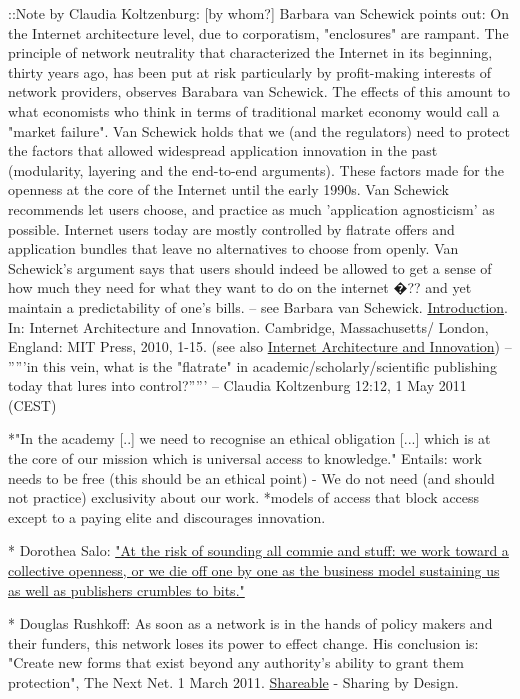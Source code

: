 \documentclass[final,authoryear,3p]{elsarticle-open-drafting}
\begin{document}
::Note by Claudia Koltzenburg:  [by whom?] Barbara van Schewick points out: On the Internet architecture level, due to corporatism, "enclosures" are rampant. The principle of network neutrality that characterized the Internet in its beginning, thirty years ago, has been put at risk particularly by profit-making interests of network providers, observes Barabara van Schewick. The effects of this amount to what economists who think in terms of traditional market economy would call a "market failure". Van Schewick holds that we (and the regulators) need to protect the factors that allowed widespread application innovation in the past (modularity, layering and the end-to-end arguments). These factors made for the openness at the core of the Internet until the early 1990s. Van Schewick recommends let users choose, and practice as much 'application agnosticism' as possible. Internet users today are mostly controlled by flatrate offers and application bundles that leave no alternatives to choose from openly. Van Schewick's argument says that users should indeed be allowed to get a sense of how much they need for what they want to do on the internet �?? and yet maintain a predictability of one's bills. -- see Barbara van Schewick. \href{http://mitpress.mit.edu/books/chapters/0262013975intro1.pdf}{Introduction}. In: Internet Architecture and Innovation. Cambridge, Massachusetts/ London, England: MIT Press, 2010, 1-15.  (see also \href{http://p2pfoundation.net/Internet_Architecture_and_Innovation}{Internet Architecture and Innovation}) -- '''''in this vein, what is the "flatrate" in academic/scholarly/scientific publishing today that lures into control?''''' -- Claudia Koltzenburg 12:12, 1 May 2011 (CEST)

*"In the academy [..] we need to recognise an ethical obligation [...] which is at the core of our mission which is universal access to knowledge." Entails: work needs to be free (this should be an ethical point) - We do not need (and should not practice) exclusivity about our work. 
*models of access that block access except to a paying elite and discourages innovation.

* Dorothea Salo:  \href{http://scientopia.org/blogs/bookoftrogool/2010/09/16/not-hanging-separately/}{"At the risk of sounding all commie and stuff: we work toward a collective openness, or we die off one by one as the business model sustaining us as well as publishers crumbles to bits."}

* Douglas Rushkoff: As soon as a network is in the hands of policy makers and their funders, this network loses its power to effect change. His conclusion is: "Create new forms that exist beyond any authority's ability to grant them protection", The Next Net. 1 March 2011. \href{http://shareable.net/blog/the-next-net}{Shareable} - Sharing by Design. 
\end{document}
